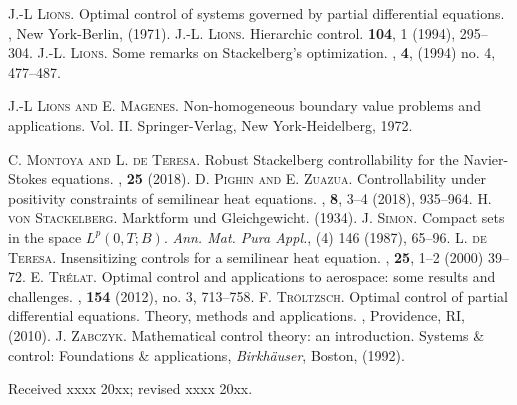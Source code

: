 \documentclass{aims}
\theoremstyle{definition}
\begin{document}
\begin{thebibliography}{99}
%
\textsc{J.-L Lions.}
\newblock Optimal control of systems governed by partial differential equations. 
, New York-Berlin, (1971).
%
%
\textsc{J.-L. Lions.}
\newblock Hierarchic control.
 \textbf{104}, 1 (1994), 295--304.
%
\textsc{J.-L. Lions.}
\newblock Some remarks on {S}tackelberg's optimization.
, \textbf{4}, 
  (1994) no. 4, 477--487.
 
\textsc{J.-L Lions and E. Magenes.}
 Non-homogeneous boundary value problems and applications. Vol. II. Springer-Verlag, New York-Heidelberg, 1972.
  
%
\textsc{C. Montoya and L. de Teresa.}
\newblock Robust Stackelberg controllability for the Navier-Stokes equations. 
, \textbf{25} (2018).
%
\textsc{D. Pighin and E. Zuazua.}
\newblock Controllability under positivity constraints of semilinear heat equations.
, \textbf{8}, 3--4 (2018), 935--964.
%
\textsc{H. von Stackelberg.}
\newblock Marktform und {G}leichgewicht.
 (1934).
%
\textsc{J. Simon.} 
\newblock Compact sets in the space $L^p(0,T;B)$. 
\newblock \emph{Ann. Mat. Pura Appl.}, (4) 146 (1987), 65--96.
%
\textsc{L. de Teresa.}
\newblock Insensitizing controls for a semilinear heat equation.
, \textbf{25}, 1--2 (2000) 39--72.
%
\textsc{E. Tr\'elat.}
 \newblock Optimal control and applications to aerospace: some results and challenges.
 , \textbf{154} (2012), no. 3, 713--758.
%
\textsc{F. Tr\"oltzsch.}
\newblock Optimal control of partial differential equations. Theory, methods and applications.
, Providence, RI, (2010).
%
\textsc{J. Zabczyk.}
\newblock Mathematical control theory: an introduction. 
\newblock Systems \& control: Foundations \& applications, {\em Birkh\"auser}, Boston, (1992).
%

\end{thebibliography}

\medskip
Received xxxx 20xx; revised xxxx 20xx.
\medskip
\end{document}
